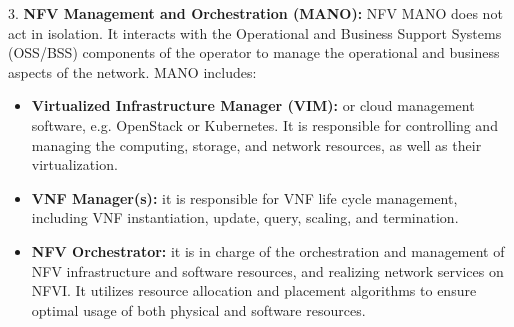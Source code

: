 3. \textbf{NFV Management and Orchestration (MANO):} NFV MANO does not act in isolation. It interacts with the Operational and Business Support Systems (OSS/BSS)
components of the operator to manage the operational and business aspects of the
network. MANO includes:

\begin{itemize}
\item \textbf{Virtualized Infrastructure Manager (VIM):} or cloud management software, e.g.
OpenStack or Kubernetes. It is responsible for controlling and managing the
computing, storage, and network resources, as well as their virtualization.
\item \textbf{VNF Manager(s):} it is responsible for VNF life cycle management, including
VNF instantiation, update, query, scaling, and termination.
\item \textbf{NFV Orchestrator:} it is in charge of the orchestration and management of NFV
infrastructure and software resources, and realizing network services on NFVI.
It utilizes resource allocation and placement algorithms to ensure optimal usage
of both physical and software resources.
\end{itemize}